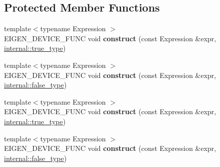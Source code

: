 \subsection*{Protected Member Functions}
\begin{DoxyCompactItemize}
\item 
\mbox{\label{class_eigen_1_1_ref_3_01const_01_t_plain_object_type_00_01_options_00_01_stride_type_01_4_ad72e94dc83764da0f163640b0ee5c77a}} 
{\footnotesize template$<$typename Expression $>$ }\\E\+I\+G\+E\+N\+\_\+\+D\+E\+V\+I\+C\+E\+\_\+\+F\+U\+NC void {\bfseries construct} (const Expression \&expr, \hyperlink{struct_eigen_1_1internal_1_1true__type}{internal\+::true\+\_\+type})
\item 
\mbox{\label{class_eigen_1_1_ref_3_01const_01_t_plain_object_type_00_01_options_00_01_stride_type_01_4_ab488e8547b27f8440132e3b8d8881f53}} 
{\footnotesize template$<$typename Expression $>$ }\\E\+I\+G\+E\+N\+\_\+\+D\+E\+V\+I\+C\+E\+\_\+\+F\+U\+NC void {\bfseries construct} (const Expression \&expr, \hyperlink{struct_eigen_1_1internal_1_1false__type}{internal\+::false\+\_\+type})
\item 
\mbox{\label{class_eigen_1_1_ref_3_01const_01_t_plain_object_type_00_01_options_00_01_stride_type_01_4_ad72e94dc83764da0f163640b0ee5c77a}} 
{\footnotesize template$<$typename Expression $>$ }\\E\+I\+G\+E\+N\+\_\+\+D\+E\+V\+I\+C\+E\+\_\+\+F\+U\+NC void {\bfseries construct} (const Expression \&expr, \hyperlink{struct_eigen_1_1internal_1_1true__type}{internal\+::true\+\_\+type})
\item 
\mbox{\label{class_eigen_1_1_ref_3_01const_01_t_plain_object_type_00_01_options_00_01_stride_type_01_4_ab488e8547b27f8440132e3b8d8881f53}} 
{\footnotesize template$<$typename Expression $>$ }\\E\+I\+G\+E\+N\+\_\+\+D\+E\+V\+I\+C\+E\+\_\+\+F\+U\+NC void {\bfseries construct} (const Expression \&expr, \hyperlink{struct_eigen_1_1internal_1_1false__type}{internal\+::false\+\_\+type})
\end{DoxyCompactItemize}
